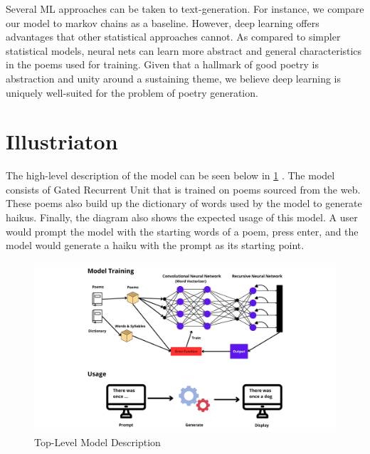 \documentclass{article} %
\begin{document}
Several ML approaches can be taken to text-generation. For instance, we compare our model to markov chains as a baseline. However, deep learning offers advantages that other statistical approaches cannot. As compared to simpler statistical models, neural nets can learn more abstract and general characteristics in the poems used for training. Given that a hallmark of good poetry is abstraction and unity around a sustaining theme, we believe deep learning is uniquely well-suited for the problem of poetry generation. 



\section{Illustriaton}
The high-level description of the model can be seen below in \ref{fig:model_diagram} .
The model consists of Gated Recurrent Unit that is trained on poems sourced from the web.
These poems also build up the dictionary of words used by the model to generate haikus.
Finally, the diagram also shows the expected usage of this model.
A user would prompt the model with the starting words of a poem, press enter,
and the model would generate a haiku with the prompt as its starting point.



\begin{figure}[h]
  \begin{center}
  \includegraphics[width=1\textwidth]{Figs/model_diagram.png}
  \end{center}
  \caption{Top-Level Model Description}
  \label{fig:model_diagram}
\end{figure}
\end{document}
